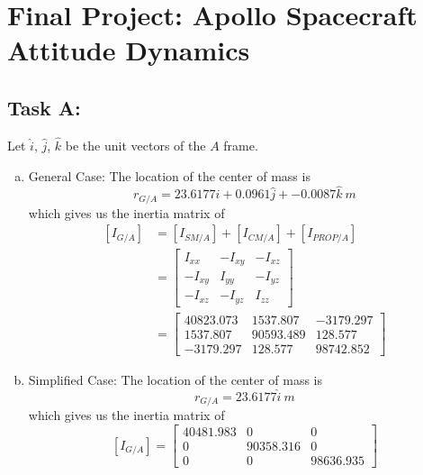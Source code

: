 \documentclass[a4paper]{article}
\begin{document}
\section*{Final Project: Apollo Spacecraft Attitude Dynamics}%

\subsection*{Task A:}%
Let $\hat{i}$, $\hat{j}$, $\hat{k}$ be the unit vectors of the $A$ frame.
\begin{enumerate}[a.]
  \item General Case:
    The location of the center of mass is
    \[
      r_{G/A} = 23.6177 \hat{i} + 0.0961 \hat{j} + -0.0087 \hat{k}\ m
    \]
    which gives us the inertia matrix of
    \[
      \begin{aligned}
        [I_{G/A}] &= [I_{SM/A}] + [I_{CM/A}] + [I_{PROP/A}] \\
                  &= 
                  \begin{bmatrix}
                    I_{xx} & -I_{xy} & -I_{xz} \\
                    -I_{xy} & I_{yy} & -I_{yz} \\
                    -I_{xz} & -I_{yz} & I_{zz}
                  \end{bmatrix} \\
            &=
            \begin{bmatrix}
              40823.073 &  1537.807 & -3179.297 \\
              1537.807 & 90593.489 & 128.577 \\
              -3179.297 & 128.577 & 98742.852
            \end{bmatrix}
      \end{aligned}
    \]
  \item Simplified Case:
    The location of the center of mass is
    \[
      r_{G/A} = 23.6177 \hat{i}\ m
    \]
    which gives us the inertia matrix of
    \[
      [I_{G/A}] = 
      \begin{bmatrix}
        40481.983 & 0 & 0 \\
        0 & 90358.316 & 0 \\
        0 & 0 & 98636.935
      \end{bmatrix}
    \]
\end{enumerate}
\end{document}
